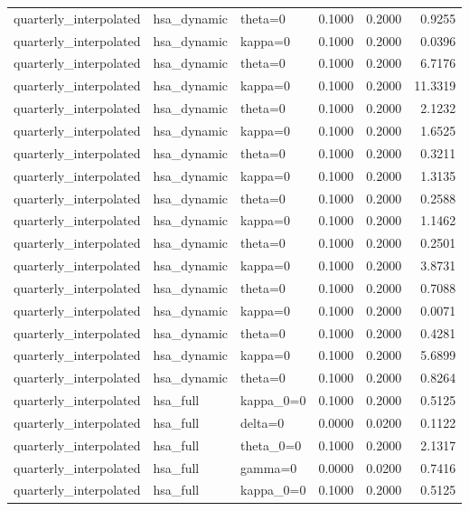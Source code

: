 \begin{tabular}{lllrrr}
quarterly\_interpolated & hsa\_dynamic & theta=0 & 0.1000 & 0.2000 & 0.9255 \\
quarterly\_interpolated & hsa\_dynamic & kappa=0 & 0.1000 & 0.2000 & 0.0396 \\
quarterly\_interpolated & hsa\_dynamic & theta=0 & 0.1000 & 0.2000 & 6.7176 \\
quarterly\_interpolated & hsa\_dynamic & kappa=0 & 0.1000 & 0.2000 & 11.3319 \\
quarterly\_interpolated & hsa\_dynamic & theta=0 & 0.1000 & 0.2000 & 2.1232 \\
quarterly\_interpolated & hsa\_dynamic & kappa=0 & 0.1000 & 0.2000 & 1.6525 \\
quarterly\_interpolated & hsa\_dynamic & theta=0 & 0.1000 & 0.2000 & 0.3211 \\
quarterly\_interpolated & hsa\_dynamic & kappa=0 & 0.1000 & 0.2000 & 1.3135 \\
quarterly\_interpolated & hsa\_dynamic & theta=0 & 0.1000 & 0.2000 & 0.2588 \\
quarterly\_interpolated & hsa\_dynamic & kappa=0 & 0.1000 & 0.2000 & 1.1462 \\
quarterly\_interpolated & hsa\_dynamic & theta=0 & 0.1000 & 0.2000 & 0.2501 \\
quarterly\_interpolated & hsa\_dynamic & kappa=0 & 0.1000 & 0.2000 & 3.8731 \\
quarterly\_interpolated & hsa\_dynamic & theta=0 & 0.1000 & 0.2000 & 0.7088 \\
quarterly\_interpolated & hsa\_dynamic & kappa=0 & 0.1000 & 0.2000 & 0.0071 \\
quarterly\_interpolated & hsa\_dynamic & theta=0 & 0.1000 & 0.2000 & 0.4281 \\
quarterly\_interpolated & hsa\_dynamic & kappa=0 & 0.1000 & 0.2000 & 5.6899 \\
quarterly\_interpolated & hsa\_dynamic & theta=0 & 0.1000 & 0.2000 & 0.8264 \\
quarterly\_interpolated & hsa\_full & kappa\_0=0 & 0.1000 & 0.2000 & 0.5125 \\
quarterly\_interpolated & hsa\_full & delta=0 & 0.0000 & 0.0200 & 0.1122 \\
quarterly\_interpolated & hsa\_full & theta\_0=0 & 0.1000 & 0.2000 & 2.1317 \\
quarterly\_interpolated & hsa\_full & gamma=0 & 0.0000 & 0.0200 & 0.7416 \\
quarterly\_interpolated & hsa\_full & kappa\_0=0 & 0.1000 & 0.2000 & 0.5125 \\

\end{tabular}
